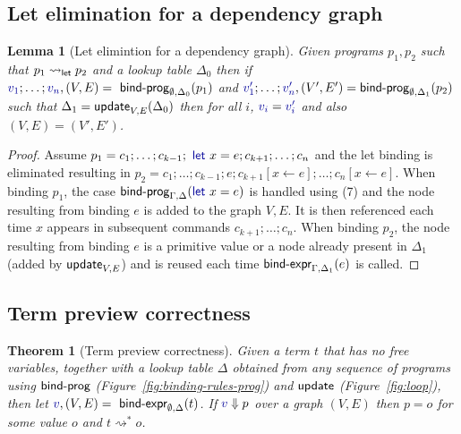 \documentclass[english,submission]{programming}
\newcounter{thc}
\theoremstyle{plain}
\newtheorem{lem}[thc]{Lemma}
\newtheorem{theorem}[thc]{Theorem}
\theoremstyle{definition}
\newcommand{\ident}[1]{\textnormal{\textcolor{idclr}{\sffamily #1}}}
\newcommand{\kvd}[1]{\textnormal{\textcolor{kvdclr}{\sffamily #1}}}
\newcommand{\bndclr}[1]{\textcolor{kvdclr}{#1}}
\begin{document}
\subsection{Let elimination for a dependency graph}
\label{sec:app-let-grp-elimination}

\begin{lem}[Let elimintion for a dependency graph]
\label{thm:app-let-grp-elimination}
Given programs $p_1, p_2$ such that $p_1 \rightsquigarrow_\ident{let} p_2$ and a lookup table
$\Delta_0$ then if $\bndclr{v_1}; \ldots; \bndclr{v_n}, (V, E) = \ident{bind-prog}_{\emptyset, \Delta_0}(p_1)$ and
$\bndclr{v'_1};\ldots;\bndclr{v'_n}, (V', E') = \ident{bind-prog}_{\emptyset, \Delta_1}(p_2)$ such that $\Delta_1 = \ident{update}_{V, E}(\Delta_0)$
then for all $i$, $\bndclr{v_i} = \bndclr{v'_i}$ and also $(V, E) = (V', E')$.
\end{lem}
\begin{proof}
Assume $p_1 = c_1; \ldots; c_{k-1}; \kvd{let}~x=e; c_{k+1};\ldots; c_n$ and the let binding is
eliminated resulting in $p_2 = c_1; \ldots; c_{k-1}; e; c_{k+1}[x\leftarrow e];\ldots; c_n[x\leftarrow e]$.
When binding $p_1$, the case $\ident{bind-prog}_{\Gamma,\Delta}(\kvd{let}~x=e)$ is handled using (7)
and the node resulting from binding $e$ is added to the graph $V, E$. It is then referenced each
time $x$ appears in subsequent commands $c_{k+1}; \ldots; c_n$.
When binding $p_2$, the node resulting from binding $e$ is a primitive value or a node already
present in $\Delta_1$ (added by $\ident{update}_{V, E}$) and is reused each time
$\ident{bind-expr}_{\Gamma,\Delta_1}(e)$ is called.
\end{proof}


\subsection{Term preview correctness}
\label{sec:app-correctness}

\begin{theorem}[Term preview correctness]
Given a term $t$ that has no free variables, together with a lookup table $\Delta$ obtained
from any sequence of programs using $\ident{bind-prog}$ (Figure~\ref{fig:binding-rules-prog}) and
$\ident{update}$ (Figure~\ref{fig:loop}), then
let $\bndclr{v}, (V, E) = \ident{bind-expr}_{\emptyset, \Delta}(t)$. If $\bndclr{v}\Downarrow p$
over a graph $(V, E)$ then $p = o$ for some value $o$ and $t \rightsquigarrow^{*} o$.
\end{theorem}
\end{document}
